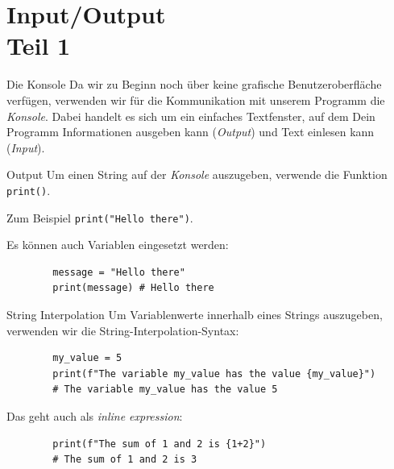 \documentclass[algorithm,pgfplots,colortheme=dark]{cuzbeamer}
\newcommand{\py}[1]{\texttt{#1}}
\begin{document}
\section{Input/Output \\ \footnotesize Teil 1}


\begin{frame}

\begin{block}{Die Konsole}
\vspace{2pt}
Da wir zu Beginn noch über keine grafische Benutzeroberfläche verfügen, verwenden wir für die Kommunikation mit unserem Programm die \emph{Konsole}. 
Dabei handelt es sich um ein einfaches Textfenster, auf dem Dein Programm Informationen ausgeben kann (\emph{Output}) und Text einlesen kann (\emph{Input}). 
\end{block}

\end{frame}

\begin{fragile}[]
	
	\begin{block}{Output}
		\vspace{2pt}
		Um einen String auf der \emph{Konsole} auszugeben, verwende die Funktion \py{print()}. 
		
		
		Zum Beispiel \py{print("Hello there")}. 
		\pause
		
		Es können auch Variablen eingesetzt werden: 
		\begin{verbatim}
		message = "Hello there"
		print(message) # Hello there
		\end{verbatim}
		
	\end{block}
	
\end{fragile}

\begin{fragile}[]
	
	\begin{block}{String Interpolation}
		\vspace{2pt}
		Um Variablenwerte innerhalb eines Strings auszugeben, verwenden wir die String-Interpolation-Syntax:
		\begin{verbatim}
		my_value = 5
		print(f"The variable my_value has the value {my_value}")
		# The variable my_value has the value 5
		\end{verbatim}
		\pause
		Das geht auch als \textit{inline expression}: 
		\begin{verbatim}
		print(f"The sum of 1 and 2 is {1+2}")
		# The sum of 1 and 2 is 3
		\end{verbatim}
		
	\end{block}
	
\end{fragile}
\end{document}
